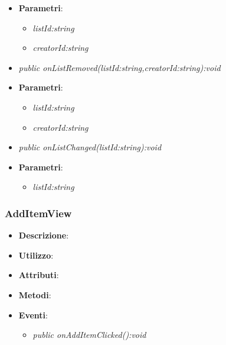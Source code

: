 \begin{itemize}
\begin{itemize}
			\item{\textbf{Parametri}: \begin{itemize}
			\item \textit{listId:string}\\

			\item \textit{creatorId:string}\\

			\end{itemize}}
	\item \textit{public onListRemoved(listId:string,creatorId:string):void}\\

			\item{\textbf{Parametri}: \begin{itemize}
			\item \textit{listId:string}\\

			\item \textit{creatorId:string}\\

			\end{itemize}}
	\item \textit{public onListChanged(listId:string):void}\\

			\item{\textbf{Parametri}: \begin{itemize}
			\item \textit{listId:string}\\

			\end{itemize}}
	\end{itemize}
\end{itemize}

\subsubsection{AddItemView}
\begin{itemize}
\item \textbf{Descrizione}: 
\item \textbf{Utilizzo}:
\item \textbf{Attributi}: 
\item \textbf{Metodi}:
\item \textbf{Eventi}:
	\begin{itemize}	
	\item \textit{public onAddItemClicked():void}\\

	\end{itemize}
\end{itemize}

